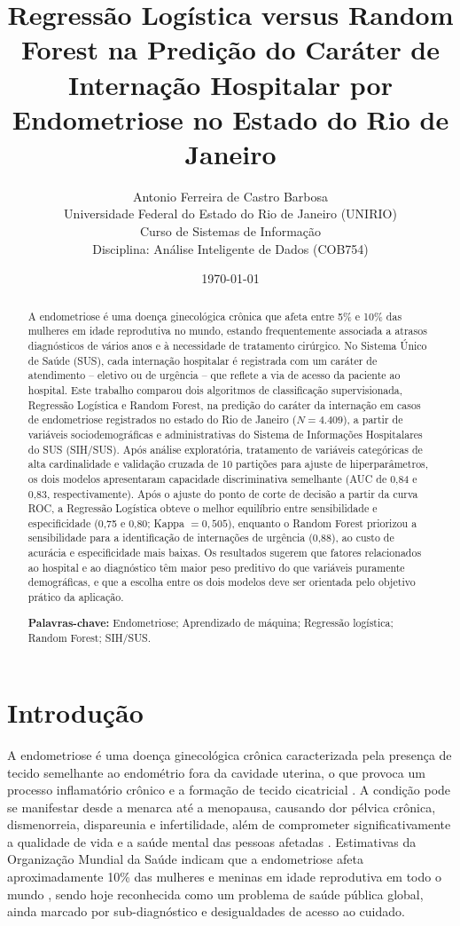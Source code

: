 \documentclass[12pt,a4paper]{article}
\title{\textbf{Regressão Logística versus Random Forest na Predição do Caráter de Internação Hospitalar por Endometriose no Estado do Rio de Janeiro}}
\author{
Antonio Ferreira de Castro Barbosa \\[2pt]
\small Universidade Federal do Estado do Rio de Janeiro (UNIRIO) \\
\small Curso de Sistemas de Informação \\
\small Disciplina: Análise Inteligente de Dados (COB754)
}
\date{\today}
\begin{document}
\maketitle

\begin{abstract}
\noindent
A endometriose é uma doença ginecológica crônica que afeta entre 5\% e 10\% das mulheres em idade reprodutiva no mundo, estando frequentemente associada a atrasos diagnósticos de vários anos e à necessidade de tratamento cirúrgico. No Sistema Único de Saúde (SUS), cada internação hospitalar é registrada com um caráter de atendimento -- eletivo ou de urgência -- que reflete a via de acesso da paciente ao hospital. Este trabalho comparou dois algoritmos de classificação supervisionada, Regressão Logística e Random Forest, na predição do caráter da internação em casos de endometriose registrados no estado do Rio de Janeiro ($N=4.409$), a partir de variáveis sociodemográficas e administrativas do Sistema de Informações Hospitalares do SUS (SIH/SUS). Após análise exploratória, tratamento de variáveis categóricas de alta cardinalidade e validação cruzada de 10 partições para ajuste de hiperparâmetros, os dois modelos apresentaram capacidade discriminativa semelhante (AUC de 0,84 e 0,83, respectivamente). Após o ajuste do ponto de corte de decisão a partir da curva ROC, a Regressão Logística obteve o melhor equilíbrio entre sensibilidade e especificidade (0,75 e 0,80; Kappa $=0,505$), enquanto o Random Forest priorizou a sensibilidade para a identificação de internações de urgência (0,88), ao custo de acurácia e especificidade mais baixas. Os resultados sugerem que fatores relacionados ao hospital e ao diagnóstico têm maior peso preditivo do que variáveis puramente demográficas, e que a escolha entre os dois modelos deve ser orientada pelo objetivo prático da aplicação.

\vspace{4pt}
\noindent\textbf{Palavras-chave:} Endometriose; Aprendizado de máquina; Regressão logística; Random Forest; SIH/SUS.
\end{abstract}

\section{Introdução}

A endometriose é uma doença ginecológica crônica caracterizada pela presença de tecido semelhante ao endométrio fora da cavidade uterina, o que provoca um processo inflamatório crônico e a formação de tecido cicatricial \cite{who2025}. A condição pode se manifestar desde a menarca até a menopausa, causando dor pélvica crônica, dismenorreia, dispareunia e infertilidade, além de comprometer significativamente a qualidade de vida e a saúde mental das pessoas afetadas \cite{who2025}. Estimativas da Organização Mundial da Saúde indicam que a endometriose afeta aproximadamente 10\% das mulheres e meninas em idade reprodutiva em todo o mundo \cite{who2025}, sendo hoje reconhecida como um problema de saúde pública global, ainda marcado por sub-diagnóstico e desigualdades de acesso ao cuidado.
\end{document}
